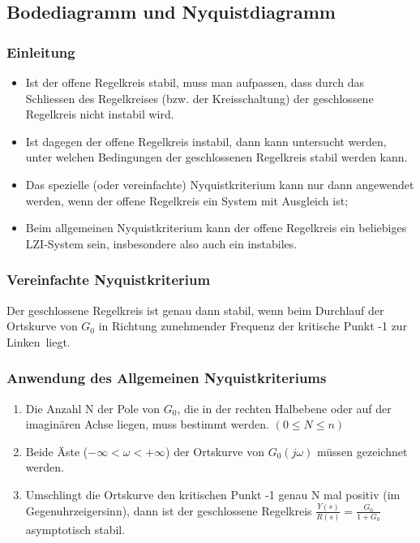 \subsection{Bodediagramm und Nyquistdiagramm }
\subsubsection{Einleitung}
\begin{itemize}
	\item Ist der offene Regelkreis stabil, muss man aufpassen, dass durch das Schliessen
	des Regelkreises (bzw. der Kreisschaltung) der geschlossene Regelkreis nicht instabil
	wird.
	\item Ist dagegen der offene Regelkreis instabil, dann kann untersucht werden, unter
	welchen Bedingungen der geschlossenen Regelkreis stabil werden kann.
	\item Das
	spezielle (oder vereinfachte) Nyquistkriterium kann nur dann angewendet werden,
	wenn der offene Regelkreis ein System mit Ausgleich ist;
	\item Beim allgemeinen Nyquistkriterium
	kann der offene Regelkreis ein beliebiges LZI-System sein, insbesondere also auch
	ein instabiles.
\end{itemize}
\subsubsection{Vereinfachte Nyquistkriterium}
		Der geschlossene Regelkreis ist genau dann stabil, wenn beim Durchlauf der
		Ortskurve von $G_0$ in Richtung zunehmender Frequenz der kritische Punkt -1 \glqq zur
		Linken\grqq\ liegt.

\subsubsection{Anwendung des Allgemeinen Nyquistkriteriums }
\begin{enumerate}
\item Die Anzahl N der Pole von $G_0$, die in der rechten Halbebene oder auf der
imaginären Achse liegen, muss bestimmt werden. $(0 \leq N \leq n)$
\item Beide Äste ($-\infty < \omega < +\infty$) der Ortskurve von $G_0(j\omega)$ müssen gezeichnet werden.
\item Umschlingt die Ortskurve den kritischen Punkt -1 genau N mal positiv (im
Gegenuhrzeigersinn), dann ist der geschlossene Regelkreis 
$\frac{Y(s)}{R(s)} = \frac{G_0}{1+G_0}$ asymptotisch stabil.
\end{enumerate}

